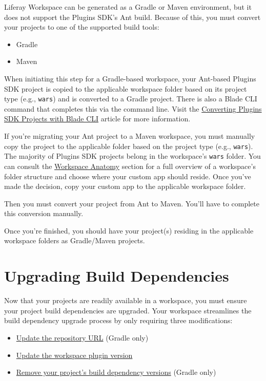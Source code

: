 Liferay Workspace can be generated as a Gradle or Maven environment, but
it does not support the Plugins SDK's Ant build. Because of this, you
must convert your projects to one of the supported build tools:

\begin{itemize}
\tightlist
\item
  Gradle
\item
  Maven
\end{itemize}

When initiating this step for a Gradle-based workspace, your Ant-based
Plugins SDK project is copied to the applicable workspace folder based
on its project type (e.g., \texttt{wars}) and is converted to a Gradle
project. There is also a Blade CLI command that completes this via the
command line. Visit the
\href{/docs/7-2/reference/-/knowledge_base/r/converting-plugins-sdk-projects-with-blade-cli}{Converting
Plugins SDK Projects with Blade CLI} article for more information.

If you're migrating your Ant project to a Maven workspace, you must
manually copy the project to the applicable folder based on the project
type (e.g., \texttt{wars}). The majority of Plugins SDK projects belong
in the workspace's \texttt{wars} folder. You can consult the
\href{/docs/7-2/reference/-/knowledge_base/r/liferay-workspace\#workspace-anatomy}{Workspace
Anatomy} section for a full overview of a workspace's folder structure
and choose where your custom app should reside. Once you've made the
decision, copy your custom app to the applicable workspace folder.

Then you must convert your project from Ant to Maven. You'll have to
complete this conversion manually.

Once you're finished, you should have your project(s) residing in the
applicable workspace folders as Gradle/Maven projects.

\chapter{Upgrading Build
Dependencies}\label{upgrading-build-dependencies}

Now that your projects are readily available in a workspace, you must
ensure your project build dependencies are upgraded. Your workspace
streamlines the build dependency upgrade process by only requiring three
modifications:

\begin{itemize}
\tightlist
\item
  \hyperref[updating-the-repository-url]{Update the repository URL}
  (Gradle only)
\item
  \hyperref[updating-the-workspace-plugin-version]{Update the workspace
  plugin version}
\item
  \hyperref[removing-your-projects-build-dependency-versions]{Remove
  your project's build dependency versions} (Gradle only)
\end{itemize}


